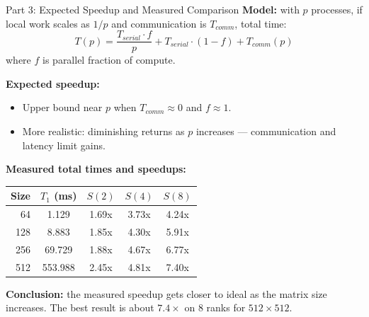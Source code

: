 \documentclass[aspectratio=169]{beamer}
\begin{document}
\begin{frame}{Part 3: Expected Speedup and Measured Comparison}
\textbf{Model:} with $p$ processes, if local work scales as $1/p$ and communication is $T_{comm}$, total time:
\[
T(p)=\frac{T_{serial}\cdot f}{p} + T_{serial}\cdot(1-f) + T_{comm}(p)
\]
where $f$ is parallel fraction of compute.

\textbf{Expected speedup:}
\begin{itemize}
  \item Upper bound near $p$ when $T_{comm}\approx 0$ and $f\approx 1$.
  \item More realistic: diminishing returns as $p$ increases — communication and latency limit gains.
\end{itemize}

\textbf{Measured total times and speedups:}
\scriptsize
\begin{tabular}{rcccc}
\toprule
Size & $T_1$ (ms) & $S(2)$ & $S(4)$ & $S(8)$ \\
\midrule
64  & 1.129 & 1.69x & 3.73x & 4.24x \\
128 & 8.883 & 1.85x & 4.30x & 5.91x \\
256 & 69.729 & 1.88x & 4.67x & 6.77x \\
512 & 553.988 & 2.45x & 4.81x & 7.40x \\
\bottomrule
\end{tabular}

\vspace{0.15cm}
\normalsize
\textbf{Conclusion:} the measured speedup gets closer to ideal as the matrix size increases. The best result is about $7.4\times$ on 8 ranks for $512\times512$.
\end{frame}
\end{document}
